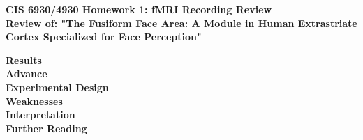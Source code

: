 \documentclass[11pt]{article}
\begin{document}
\begin{center}
{\large {\bf CIS 6930/4930 Homework 1: fMRI Recording Review}}\\
{\normalsize {\bf Review of: "The Fusiform Face Area: A Module in Human Extrastriate Cortex
Specialized for Face Perception"}}
\end{center}

\textbf{Results} \\

\textbf{Advance} \\

\textbf{Experimental Design} \\

\textbf{Weaknesses} \\

\textbf{Interpretation} \\

\textbf{Further Reading} \\
\end{document}
